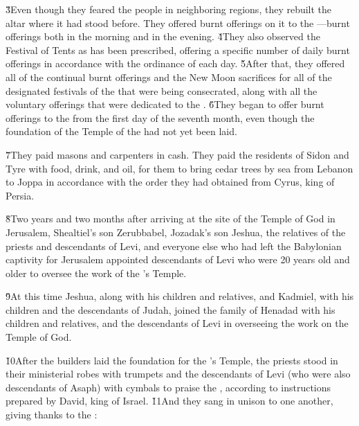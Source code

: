 \v{3}Even though they feared the people in neighboring regions, they rebuilt the altar where it had stood before. They offered burnt offerings on it to the ---burnt offerings both in the morning and in the evening. \v{4}They also observed the Festival of Tents as has been prescribed, offering a specific number of daily burnt offerings in accordance with the ordinance of each day. \v{5}After that, they offered all of the continual burnt offerings and the New Moon sacrifices for all of the designated festivals of the  that were being consecrated, along with all the voluntary offerings that were dedicated to the . \v{6}They began to offer burnt offerings to the  from the first day of the seventh month, even though the foundation of the Temple of the  had not yet been laid.

\v{7}They paid masons and carpenters in cash. They paid the residents of Sidon and Tyre with food, drink, and oil, for them to bring cedar trees by sea from Lebanon to Joppa in accordance with the order they had obtained from Cyrus, king of Persia.

\v{8}Two years and two months after arriving at the site of the Temple of God in Jerusalem, Shealtiel's son Zerubbabel, Jozadak's son Jeshua, the relatives of the priests and descendants of Levi, and everyone else who had left the Babylonian captivity for Jerusalem appointed descendants of Levi who were 20 years old and older to oversee the work of the 's Temple.

\v{9}At this time Jeshua, along with his children and relatives, and Kadmiel, with his children and the descendants of Judah, joined the family of Henadad with his children and relatives, and the descendants of Levi in overseeing the work on the Temple of God.

\v{10}After the builders laid the foundation for the 's Temple, the priests stood in their ministerial robes with trumpets and the descendants of Levi (who were also descendants of Asaph) with cymbals to praise the , according to instructions prepared by David, king of Israel. \v{11}And they sang in unison to one another, giving thanks to the :

